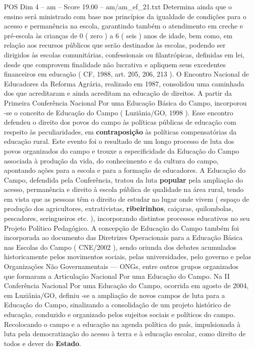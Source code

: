 \begin{textsample}{POS Dim 4 – am – Score 19.00 – am/am\_ef\_21.txt}
Determina ainda que o ensino será ministrado com base nos princípios da igualdade de condições para o acesso e permanência na escola, garantindo também o atendimento em creche e pré-escola às crianças de 0 ( zero ) a 6 ( seis ) anos de idade, bem como, em relação aos recursos públicos que serão destinados às escolas, podendo ser dirigidos às escolas comunitárias, confessionais ou filantrópicas, definidas em lei, desde que comprovem finalidade não lucrativa e apliquem seus excedentes financeiros em educação ( CF, 1988, art. 205, 206, 213 ).
O Encontro Nacional de Educadores da Reforma Agrária, realizado em 1987, consolidou uma caminhada dos que acreditaram e ainda acreditam na educação de direitos.
A partir da Primeira Conferência Nacional Por uma Educação Básica do Campo, incorporou -se o conceito de Educação do Campo ( Luziânia/GO, 1998 ).
Esse encontro defendeu o direito dos povos do campo às políticas públicas de educação com respeito às peculiaridades, em \textbf{contraposição} às políticas compensatórias da educação rural.
Este evento foi o resultado de um longo processo de luta dos povos organizados do campo e trouxe a especificidade da Educação do Campo associada à produção da vida, do conhecimento e da cultura do campo, apontando ações para a escola e para a formação de educadores.
A Educação do Campo, defendida pela Conferência, tratou da luta \textbf{popular} pela ampliação do acesso, permanência e direito à escola pública de qualidade na área rural, tendo em vista que as pessoas têm o direito de estudar no lugar onde vivem ( espaço de produção dos agricultores, extrativistas, \textbf{ribeirinhos}, caiçaras, quilombolas, pescadores, seringueiros etc. ), incorporando distintos processos educativos no seu Projeto Político Pedagógico.
A concepção de Educação do Campo também foi incorporada ao documento das Diretrizes Operacionais para a Educação Básica nas Escolas do Campo ( CNE/2002 ), sendo oriunda dos debates acumulados historicamente pelos movimentos sociais, pelas universidades, pelo governo e pelas Organizações Não Governamentais — ONGs, entre outros grupos organizados que formaram a Articulação Nacional Por uma Educação do Campo.
Na II Conferência Nacional Por uma Educação do Campo, ocorrida em agosto de 2004, em Luziânia/GO, definiu -se a ampliação de novos campos de luta para a Educação do Campo, sinalizando a consolidação de um projeto histórico de educação, conduzido e organizado pelos sujeitos sociais e políticos do campo.
Recolocando o campo e a educação na agenda política do país, impulsionada à luta pela democratização do acesso à terra e à educação escolar, como direito de todos e dever do \textbf{Estado}.

\end{textsample}

